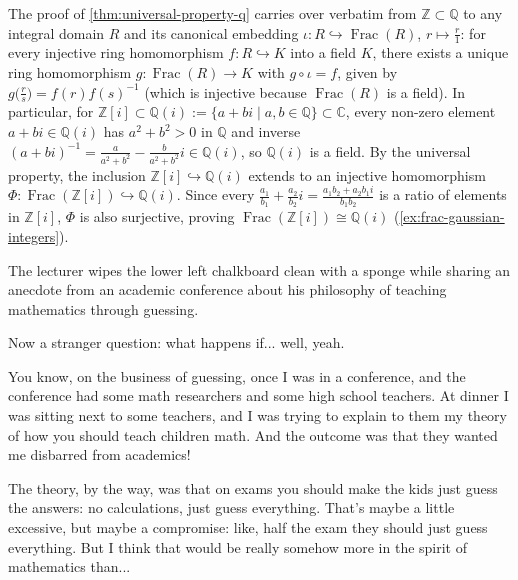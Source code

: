 \begin{aiNote}
The proof of \cref{thm:universal-property-q} carries over verbatim from $\mathbb{Z} \subset \mathbb{Q}$ to any integral domain $R$ and its canonical embedding $\iota \colon R \hookrightarrow \operatorname{Frac}(R)$, $r \mapsto \frac{r}{1}$: for every injective ring homomorphism $f \colon R \hookrightarrow K$ into a field $K$, there exists a unique ring homomorphism $g \colon \operatorname{Frac}(R) \to K$ with $g \circ \iota = f$, given by $g\bigl(\frac{r}{s}\bigr) = f(r) f(s)^{-1}$ (which is injective because $\operatorname{Frac}(R)$ is a field). In particular, for $\mathbb{Z}[i] \subset \mathbb{Q}(i) := \{a + bi \mid a, b \in \mathbb{Q}\} \subset \mathbb{C}$, every non-zero element $a + bi \in \mathbb{Q}(i)$ has $a^2 + b^2 > 0$ in $\mathbb{Q}$ and inverse $(a + bi)^{-1} = \frac{a}{a^2+b^2} - \frac{b}{a^2+b^2}i \in \mathbb{Q}(i)$, so $\mathbb{Q}(i)$ is a field. By the universal property, the inclusion $\mathbb{Z}[i] \hookrightarrow \mathbb{Q}(i)$ extends to an injective homomorphism $\Phi \colon \operatorname{Frac}(\mathbb{Z}[i]) \hookrightarrow \mathbb{Q}(i)$. Since every $\frac{a_1}{b_1} + \frac{a_2}{b_2}i = \frac{a_1 b_2 + a_2 b_1 i}{b_1 b_2}$ is a ratio of elements in $\mathbb{Z}[i]$, $\Phi$ is also surjective, proving $\operatorname{Frac}(\mathbb{Z}[i]) \cong \mathbb{Q}(i)$ (\cref{ex:frac-gaussian-integers}).
\end{aiNote}

\begin{note}
The lecturer wipes the lower left chalkboard clean with a sponge while sharing an anecdote from an academic conference about his philosophy of teaching mathematics through guessing.
\end{note}

\begin{speech}[01:13:22 - 01:14:49]
Now a stranger question: what happens if... well, yeah.

You know, on the business of guessing, once I was in a conference, and the conference had some math researchers and some high school teachers. At dinner I was sitting next to some teachers, and I was trying to explain to them my theory of how you should teach children math. And the outcome was that they wanted me disbarred from academics! 

The theory, by the way, was that on exams you should make the kids just guess the answers: no calculations, just guess everything. That's maybe a little excessive, but maybe a compromise: like, half the exam they should just guess everything. But I think that would be really somehow more in the spirit of mathematics than...

\end{speech}

